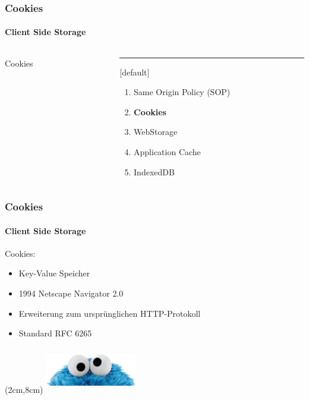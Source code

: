 \begin{frame}
\frametitle{Cookies}
\framesubtitle{Client Side Storage}
\begin{columns}[T] %
\begin{column}{.48\textwidth}

\begin{center}
{\Huge Cookies}
\end{center}

\end{column}%
\hfill%
\begin{column}{.48\textwidth}
\color{blue}\rule{\linewidth}{4pt}

	[default]
	\begin{enumerate}
		\item Same Origin Policy (SOP)
		\item \textbf{Cookies}
		\item WebStorage
		\item Application Cache
		\item IndexedDB
	\end{enumerate}
\end{column}%
\end{columns}
\end{frame}

\begin{frame}
\frametitle{Cookies}
\framesubtitle{Client Side Storage}
Cookies:
	\begin{itemize}
		\item <1> Key-Value Speicher
		\item 1994 Netscape Navigator 2.0 
		\item Erweiterung zum ursprünglichen HTTP-Protokoll
		\item Standard RFC 6265
	\end{itemize}
	\begin{textblock*}{6cm}(2cm,8cm) %
		\includegraphics[height=2cm,width=4cm]{img/cm.png}
	\end{textblock*}
\end{frame}

